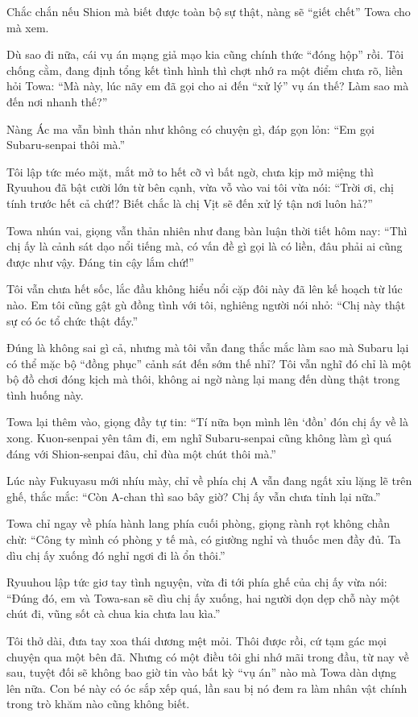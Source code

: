 \documentclass[../main.tex]{subfiles}
\begin{document}
Chắc chắn nếu Shion mà biết được toàn bộ sự thật, nàng sẽ ``giết chết'' Towa cho mà xem.

\ct

Dù sao đi nữa, cái vụ án mạng giả mạo kia cũng chính thức ``đóng hộp'' rồi. Tôi chống cằm, đang định tổng kết tình hình thì chợt nhớ ra một điểm chưa rõ, liền hỏi Towa: ``Mà này, lúc nãy em đã gọi cho ai đến ``xử lý'' vụ án thế? Làm sao mà đến nơi nhanh thế?''

Nàng Ác ma vẫn bình thản như không có chuyện gì, đáp gọn lỏn: ``Em gọi Subaru-senpai thôi mà.''

Tôi lập tức méo mặt, mắt mở to hết cỡ vì bất ngờ, chưa kịp mở miệng thì Ryuuhou đã bật cười lớn từ bên cạnh, vừa vỗ vào vai tôi vừa nói: ``Trời ơi, chị tính trước hết cả chứ!? Biết chắc là chị Vịt sẽ đến xử lý tận nơi luôn hả?''

Towa nhún vai, giọng vẫn thản nhiên như đang bàn luận thời tiết hôm nay: ``Thì chị ấy là cảnh sát dạo nổi tiếng mà, có vấn đề gì gọi là có liền, đâu phải ai cũng được như vậy. Đáng tin cậy lắm chứ!''

Tôi vẫn chưa hết sốc, lắc đầu không hiểu nổi cặp đôi này đã lên kế hoạch từ lúc nào. Em tôi cũng gật gù đồng tình với tôi, nghiêng người nói nhỏ: ``Chị này thật sự có óc tổ chức thật đấy.''

Đúng là không sai gì cả, nhưng mà tôi vẫn đang thắc mắc làm sao mà Subaru lại có thể mặc bộ ``đồng phục'' cảnh sát đến sớm thế nhỉ? Tôi vẫn nghĩ đó chỉ là một bộ đồ chơi đóng kịch mà thôi, không ai ngờ nàng lại mang đến dùng thật trong tình huống này.

Towa lại thêm vào, giọng đầy tự tin: ``Tí nữa bọn mình lên `đồn' đón chị ấy về là xong. Kuon-senpai yên tâm đi, em nghĩ Subaru-senpai cũng không làm gì quá đáng với Shion-senpai đâu, chỉ đùa một chút thôi mà.''

Lúc này Fukuyasu mới nhíu mày, chỉ về phía chị A vẫn đang ngất xỉu lặng lẽ trên ghế, thắc mắc: ``Còn A-chan thì sao bây giờ? Chị ấy vẫn chưa tỉnh lại nữa.''

Towa chỉ ngay về phía hành lang phía cuối phòng, giọng rành rọt không chần chừ: ``Công ty mình có phòng y tế mà, có giường nghỉ và thuốc men đầy đủ. Ta dìu chị ấy xuống đó nghỉ ngơi đi là ổn thôi.''

Ryuuhou lập tức giơ tay tình nguyện, vừa đi tới phía ghế của chị ấy vừa nói: ``Đúng đó, em và Towa-san sẽ dìu chị ấy xuống, hai người dọn dẹp chỗ này một chút đi, vũng sốt cà chua kia chưa lau kìa.''

Tôi thở dài, đưa tay xoa thái dương mệt mỏi. Thôi được rồi, cứ tạm gác mọi chuyện qua một bên đã. Nhưng có một điều tôi ghi nhớ mãi trong đầu, từ nay về sau, tuyệt đối sẽ không bao giờ tin vào bất kỳ ``vụ án'' nào mà Towa dàn dựng lên nữa. Con bé này có óc sắp xếp quá, lần sau bị nó đem ra làm nhân vật chính trong trò khăm nào cũng không biết.
\end{document}
